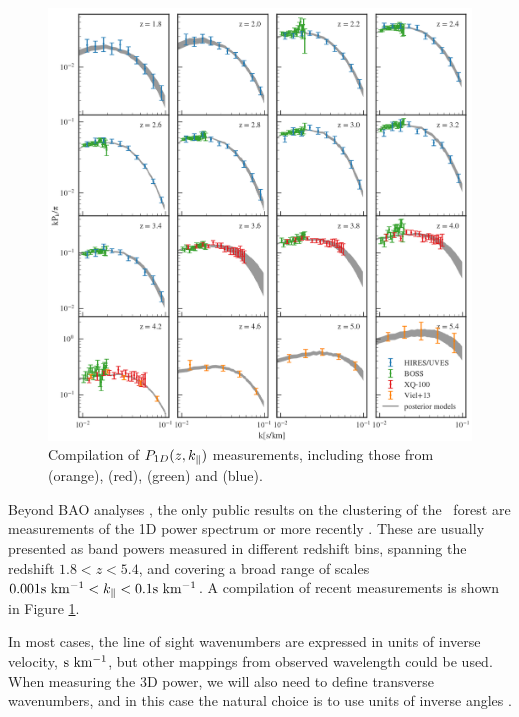 \begin{figure}[h]
 \begin{center}
  \includegraphics[scale=0.34]{figures/Walther2018_P1D}
 \end{center}
 \caption{Compilation of $P_{1D}(z,k_\parallel)$ measurements, including those from
  \cite{Viel2013} (orange), \cite{Irsic2017} (red), 
  \cite{Palanque-Delabrouille2013} (green) and \cite{Walther2018a} (blue). 
 }
 \label{fig:dataP1D}
\end{figure}

Beyond BAO analyses \cite{Bautista2017,duMasdesBourboux2017}, the only 
public results on the clustering of the \lya\ forest are measurements of 
the 1D power spectrum \cite{Croft1998,McDonald2000,McDonald2006} or 
more recently \cite{Viel2013,Palanque-Delabrouille2013,Irsic2017,Walther2018a}.
These are usually presented as band powers measured in different redshift
bins, spanning the redshift $1.8 < z < 5.4$, and covering a broad range of 
scales $0.001 {\rm s~km^{-1}} < k_\parallel < 0.1 {\rm s~km^{-1}}$. 
A compilation of recent measurements is shown in Figure \ref{fig:dataP1D}.

In most cases, the line of sight wavenumbers are expressed in units of 
inverse velocity, ${\rm s~km^{-1}}$, but other mappings from observed wavelength 
could be used.
When measuring the 3D power, we will also need to define transverse 
wavenumbers, and in this case the natural choice is to use units of 
inverse angles \cite{Font-Ribera2018}.


